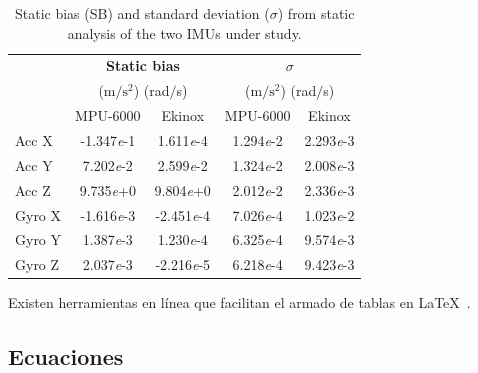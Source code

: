 \documentclass{article}
\begin{document}
\begin{table}[ht]

\small
	\centering
	\caption{Static bias (SB) and standard deviation ($\sigma$) from static analysis of the two IMUs under study.}
	\label{tab:IMU-static}
	\begin{tabular}{l cc cc}
	
	\toprule %

	&  \multicolumn{2}{c}{ \textbf{Static bias} } &  \multicolumn{2}{c}{ \textbf{$\sigma$}} \\
    
    &  \multicolumn{2}{c}{(m$/\text{s}^2$) (rad$/$s) }   &  \multicolumn{2}{c}{(m$/\text{s}^2$) (rad$/$s) } \\
	    
	\midrule 

	&  {MPU-6000} & Ekinox &  {MPU-6000} & Ekinox \\	
  
	\midrule 

 Acc X      & -1.347\emph{e}-1  	& 1.611\emph{e}-4  	& 1.294\emph{e}-2 	& 2.293\emph{e}-3 \\

 Acc Y      & 7.202\emph{e}-2  	& 2.599\emph{e}-2  	& 1.324\emph{e}-2 	& 2.008\emph{e}-3  \\
  
 Acc Z     	& 9.735\emph{e}+0   	& 9.804\emph{e}+0 	& 2.012\emph{e}-2  	& 2.336\emph{e}-3 \\

 Gyro X     & -1.616\emph{e}-3 	&-2.451\emph{e}-4  	& 7.026\emph{e}-4   	& 1.023\emph{e}-2 \\

 Gyro Y  	& 1.387\emph{e}-3   	& 1.230\emph{e}-4 	& 6.325\emph{e}-4  	& 9.574\emph{e}-3 \\

 Gyro Z  	& 2.037\emph{e}-3   	& -2.216\emph{e}-5	& 6.218\emph{e}-4   	& 9.423\emph{e}-3 \\

	\bottomrule

\end{tabular}
\end{table}

Existen herramientas en línea que facilitan el armado de tablas en \LaTeX $\,$ \cite{TableGenerator}.

\subsection{Ecuaciones}
\end{document}
